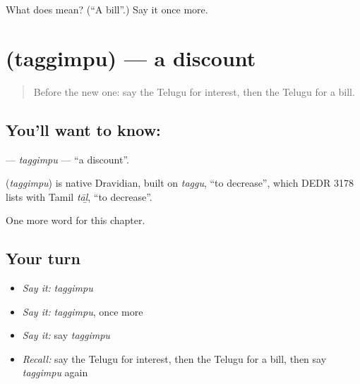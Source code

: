 \begin{tcolorbox}[breakable,colback=teal!4,colframe=teal!35!black,title={Before you move on}]
What does  mean? (\textquotedblleft{}A bill\textquotedblright{}.) Say it once more.
\end{tcolorbox}
\section[\texorpdfstring{\te{తగ్గింపు} (taggimpu)}{తగ్గింపు (taggimpu)}]{ (taggimpu) — a discount}

\label{lesson:TE-C273-taggimpu}



\begin{quote}
Before the new one: say the Telugu for interest, then the Telugu for a bill.
\end{quote}

\subsection*{You'll want to know: }
\textbf{} — \emph{taggimpu} — \textquotedblleft{}a discount\textquotedblright{}.

\begin{cousinweb}
\textbf{} (\emph{taggimpu}) is native Dravidian, built on \emph{taggu}, \textquotedblleft{}to decrease\textquotedblright{}, which DEDR 3178 lists with Tamil \emph{tāḻ}, \textquotedblleft{}to decrease\textquotedblright{}.
\end{cousinweb}

\begin{grammarlens}[title={What you've built}]
One more word for this chapter.
\end{grammarlens}

\subsection*{Your turn}
\begin{itemize}
\raggedright
  \item \emph{Say it:} \emph{taggimpu}
  \item \emph{Say it:} \emph{taggimpu}, once more
  \item \emph{Say it:} say \emph{taggimpu}
  \item \emph{Recall:} say the Telugu for interest, then the Telugu for a bill, then say \emph{taggimpu} again
\end{itemize}


